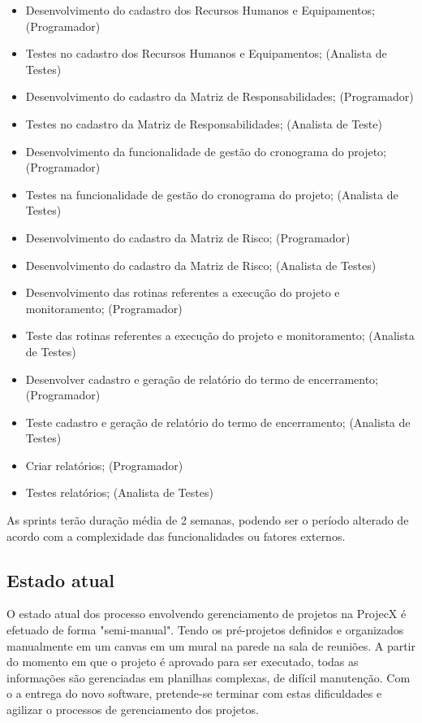 \documentclass[	DIV=calc,%
							paper=a4,%
							fontsize=12pt,%
							onecolumn]{scrartcl}	 					%
\begin{document}
\begin{itemize}
	\item Desenvolvimento do cadastro dos Recursos Humanos e Equipamentos; (Programador)
	\item Testes no cadastro dos Recursos Humanos e Equipamentos; (Analista de Testes)
	\item Desenvolvimento do cadastro da Matriz de Responsabilidades; (Programador)
	\item Testes no cadastro da Matriz de Responsabilidades; (Analista de Teste)
	\item Desenvolvimento da funcionalidade de gestão do cronograma do projeto; (Programador)
	\item Testes na funcionalidade de gestão do cronograma do projeto; (Analista de Testes)
	\item Desenvolvimento do cadastro da Matriz de Risco; (Programador)
	\item Desenvolvimento do cadastro da Matriz de Risco; (Analista de Testes)
	\item Desenvolvimento das rotinas referentes a execução do projeto e monitoramento; (Programador)
	\item Teste das rotinas referentes a execução do projeto e monitoramento; (Analista de Testes)
	\item Desenvolver cadastro e geração de relatório do termo de encerramento; (Programador)
	\item Teste cadastro e geração de relatório do termo de encerramento; (Analista de Testes)
	\item Criar relatórios; (Programador)
	\item Testes relatórios; (Analista de Testes)
\end{itemize}

As sprints terão duração média de 2 semanas, podendo ser o período alterado de acordo com a complexidade das funcionalidades ou fatores externos.
 


\subsection{Estado atual}
O estado atual dos processo envolvendo gerenciamento de projetos na ProjecX é efetuado de forma "semi-manual". Tendo os pré-projetos definidos e organizados manualmente em um canvas em um mural na parede na sala de reuniões. A partir do momento em que o projeto é aprovado para ser executado, todas as informações são gerenciadas em planilhas complexas, de difícil manutenção.
Com o a entrega do novo software, pretende-se terminar com estas dificuldades e agilizar o processos de gerenciamento dos projetos.
\end{document}
